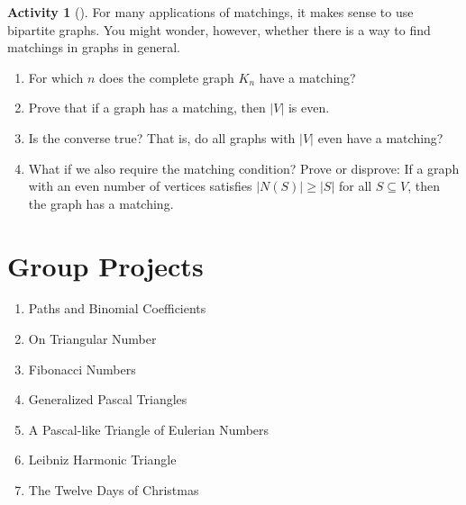 \documentclass[10pt,]{book}
\theoremstyle{plain}
\theoremstyle{definition}
\theoremstyle{definition}
\theoremstyle{definition}
\newtheorem{activity}[project]{Activity}
\numberwithin{equation}{chapter}
\newcommand{\card}[1]{\left| #1 \right|}
\begin{document}
\begin{activity}[]\label{activity-320}
\hypertarget{p-1723}{}%
For many applications of matchings, it makes sense to use bipartite graphs. You might wonder, however, whether there is a way to find matchings in graphs in general.%
\begin{enumerate}[font=\bfseries,label=(\alph*),ref=\alph*]
\item\label{task-289} \hypertarget{p-1724}{}%
For which \(n\) does the complete graph \(K_n\) have a matching?%
\item\label{task-290} \hypertarget{p-1725}{}%
Prove that if a graph has a matching, then \(\card{V}\) is even.%
\item\label{task-291} \hypertarget{p-1726}{}%
Is the converse true?  That is, do all graphs with \(\card{V}\) even have a matching?%
\item\label{task-292} \hypertarget{p-1727}{}%
What if we also require the matching condition?  Prove or disprove: If a graph with an even number of vertices satisfies \(\card{N(S)} \ge \card{S}\) for all \(S \subseteq V\), then the graph has a matching.%
\end{enumerate}
\end{activity}
%
%
%
\appendix
%
\typeout{************************************************}
\typeout{************************************************}
\chapter[{Group Projects}]{Group Projects}\label{app_projects}
\hypertarget{p-1728}{}%
\leavevmode%
\begin{enumerate}
\item\hypertarget{li-68}{}Paths and Binomial Coefficients%
\item\hypertarget{li-69}{}On Triangular Number%
\item\hypertarget{li-70}{}Fibonacci Numbers%
\item\hypertarget{li-71}{}Generalized Pascal Triangles%
\item\hypertarget{li-72}{}A Pascal-like Triangle of Eulerian Numbers%
\item\hypertarget{li-73}{}Leibniz Harmonic Triangle%
\item\hypertarget{li-74}{}The Twelve Days of Christmas%
\end{enumerate}
%
\typeout{************************************************}
\typeout{************************************************}
\end{document}
